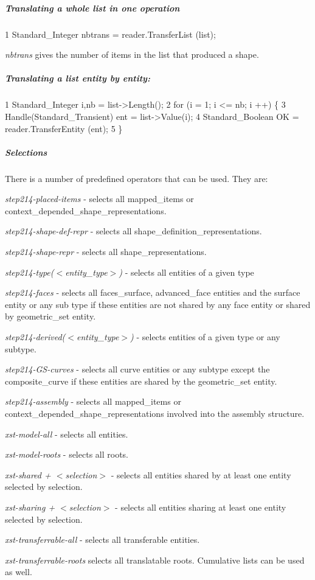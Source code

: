 \subparagraph*{Translating a whole list in one operation}


\begin{DoxyCode}
1 Standard\_Integer nbtrans = reader.TransferList (list); 
\end{DoxyCode}
 {\itshape nbtrans} gives the number of items in the list that produced a shape.

\subparagraph*{Translating a list entity by entity\+:}


\begin{DoxyCode}
1 Standard\_Integer i,nb = list->Length();
2 for (i = 1; i <= nb; i ++) \{
3  Handle(Standard\_Transient) ent = list->Value(i);
4  Standard\_Boolean OK = reader.TransferEntity (ent);
5 \}
\end{DoxyCode}


\subparagraph*{Selections}

There is a number of predefined operators that can be used. They are\+:
\begin{DoxyItemize}
\item {\itshape step214-\/placed-\/items} -\/ selects all mapped\+\_\+items or context\+\_\+depended\+\_\+shape\+\_\+representations.
\item {\itshape step214-\/shape-\/def-\/repr} -\/ selects all shape\+\_\+definition\+\_\+representations.
\item {\itshape step214-\/shape-\/repr} -\/ selects all shape\+\_\+representations.
\item {\itshape step214-\/type($<$entity\+\_\+type$>$)} -\/ selects all entities of a given type
\item {\itshape step214-\/faces} -\/ selects all faces\+\_\+surface, advanced\+\_\+face entities and the surface entity or any sub type if these entities are not shared by any face entity or shared by geometric\+\_\+set entity.
\item {\itshape step214-\/derived($<$entity\+\_\+type$>$)} -\/ selects entities of a given type or any subtype.
\item {\itshape step214-\/\+G\+S-\/curves} -\/ selects all curve entities or any subtype except the composite\+\_\+curve if these entities are shared by the geometric\+\_\+set entity.
\item {\itshape step214-\/assembly} -\/ selects all mapped\+\_\+items or context\+\_\+depended\+\_\+shape\+\_\+representations involved into the assembly structure.
\item {\itshape xst-\/model-\/all} -\/ selects all entities.
\item {\itshape xst-\/model-\/roots} -\/ selects all roots.
\item {\itshape xst-\/shared + $<$selection$>$} -\/ selects all entities shared by at least one entity selected by selection.
\item {\itshape xst-\/sharing + $<$selection$>$} -\/ selects all entities sharing at least one entity selected by selection.
\item {\itshape xst-\/transferrable-\/all} -\/ selects all transferable entities.
\item {\itshape xst-\/transferrable-\/roots} selects all translatable roots. Cumulative lists can be used as well.
\end{DoxyItemize}

